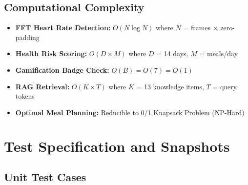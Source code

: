 \documentclass[12pt,a4paper]{report}
\begin{document}
\section{Computational Complexity}
\begin{itemize}
  \item \textbf{FFT Heart Rate Detection:} $O(N \log N)$ where $N$ = frames $\times$ zero-padding
  \item \textbf{Health Risk Scoring:} $O(D \times M)$ where $D$ = 14 days, $M$ = meals/day
  \item \textbf{Gamification Badge Check:} $O(B) = O(7) = O(1)$
  \item \textbf{RAG Retrieval:} $O(K \times T)$ where $K$ = 13 knowledge items, $T$ = query tokens
  \item \textbf{Optimal Meal Planning:} Reducible to 0/1 Knapsack Problem (NP-Hard)
\end{itemize}

\chapter{Test Specification and Snapshots}

\section{Unit Test Cases}
\end{document}
